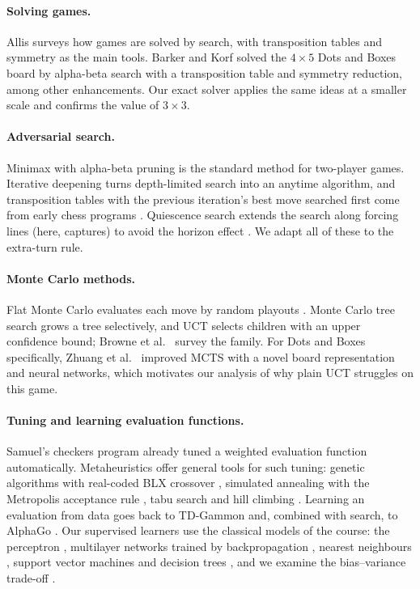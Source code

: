 \documentclass[11pt,a4paper]{article}
\newcommand{\bd}[2]{$#1{\times}#2$}            %
\begin{document}
\paragraph{Solving games.}
Allis \cite{allis1994searching} surveys how games are solved by search, with
transposition tables and symmetry as the main tools. Barker and Korf
\cite{barker2012solving} solved the \bd{4}{5} Dots and Boxes board by alpha-beta search
with a transposition table and symmetry reduction, among other enhancements. Our exact
solver applies the same ideas at a smaller scale and confirms the value of \bd{3}{3}.

\paragraph{Adversarial search.}
Minimax with alpha-beta pruning \cite{knuth1975alphabeta,russell2020aima} is the
standard method for two-player games. Iterative deepening \cite{korf1985iddfs} turns
depth-limited search into an anytime algorithm, and transposition tables with the
previous iteration's best move searched first come from early chess programs
\cite{slate1977chess}. Quiescence search extends the search along forcing lines (here,
captures) to avoid the horizon effect \cite{russell2020aima}. We adapt all of these to
the extra-turn rule.

\paragraph{Monte Carlo methods.}
Flat Monte Carlo evaluates each move by random playouts \cite{brugmann1993montecarlo}.
Monte Carlo tree search \cite{coulom2006efficient} grows a tree selectively, and UCT
\cite{kocsis2006bandit} selects children with an upper confidence bound; Browne et al.\
\cite{browne2012survey} survey the family. For Dots and Boxes specifically, Zhuang et
al.\ \cite{zhuang2015dotsboxes} improved MCTS with a novel board representation and
neural networks, which motivates our analysis of why plain UCT struggles on this game.

\paragraph{Tuning and learning evaluation functions.}
Samuel's checkers program \cite{samuel1959checkers} already tuned a weighted evaluation
function automatically. Metaheuristics offer general tools for such tuning: genetic
algorithms \cite{holland1975adaptation} with real-coded BLX crossover
\cite{eshelman1993blx}, simulated annealing \cite{kirkpatrick1983annealing} with the
Metropolis acceptance rule \cite{metropolis1953equation}, tabu search \cite{glover1989tabu}
and hill climbing \cite{russell2020aima}. Learning an evaluation from data goes back to
TD-Gammon \cite{tesauro1995tdgammon} and, combined with search, to AlphaGo
\cite{silver2016alphago}. Our supervised learners use the classical models of the
course: the perceptron \cite{rosenblatt1958perceptron}, multilayer networks trained by
backpropagation \cite{rumelhart1986backprop}, nearest neighbours \cite{cover1967nearest},
support vector machines \cite{cortes1995svm} and decision trees \cite{quinlan1986id3},
and we examine the bias--variance trade-off \cite{geman1992biasvariance}.
\end{document}

